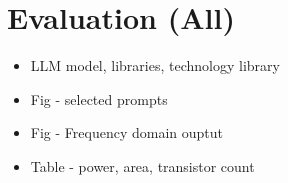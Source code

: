 \section{Evaluation (All)}
\label{sec:evaluation}
\begin{itemize}
    \item LLM model, libraries, technology library
    \item Fig - selected prompts
    \item Fig - Frequency domain ouptut
    \item Table - power, area, transistor count
\end{itemize}
